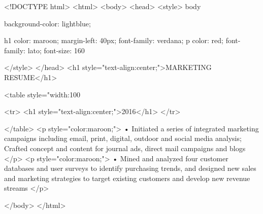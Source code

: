 <!DOCTYPE html>
<html>
<body>
<head>
<style>
body {
    background-color: lightblue;
    
}

h1 {
    color: maroon;
    margin-left: 40px;
    font-family: verdana;
} 
p  {
    color: red;
    font-family: lato;
    font-size: 160%
}

</style>
</head>
<h1 style="text-align:center;">MARKETING RESUME</h1>

<table style="width:100%
  
  <tr>   
  <h1 style="text-align:center;">2016</h1>
  </tr>
  

</table>
<p style="color:maroon;">
•	Initiated a series of integrated marketing campaigns including email, print, digital, outdoor and social media analysis; Crafted concept and content for journal ads, direct mail campaigns and blogs
</p>
<p style="color:maroon;">
•	Mined and analyzed four customer databases and user surveys to identify purchasing trends, and designed new sales and marketing strategies to target existing customers and develop new revenue streams
</p>


</body>
</html>
